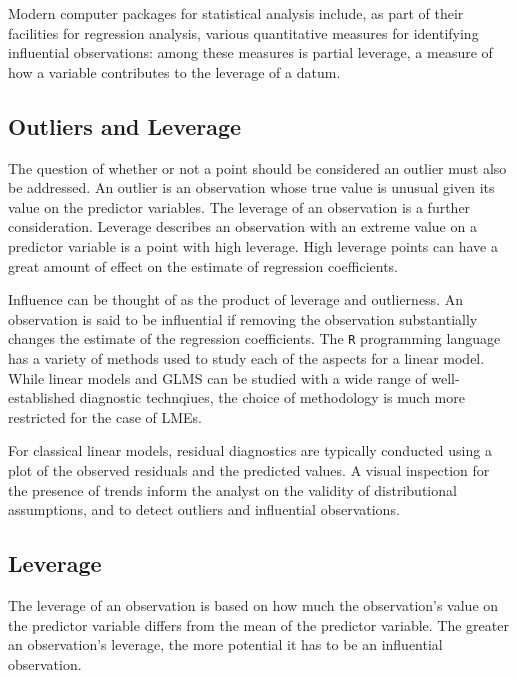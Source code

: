 \documentclass[12pt, a4paper]{article}
\begin{document}
Modern computer packages for statistical analysis include, as part of their facilities for regression analysis, various quantitative measures for identifying influential observations: among these measures is partial leverage, a measure of how a variable contributes to the leverage of a datum.




\subsection{Outliers and Leverage}


The question of whether or not a point should be considered an outlier must also be addressed. An outlier is an observation whose true value is unusual given its value on the predictor variables. The leverage of an observation is a further consideration. Leverage describes an observation with an extreme value on a predictor variable is a point with high leverage. High leverage points can have a great amount of effect on the estimate of regression coefficients.

Influence can be thought of as the product of leverage and outlierness. An observation is said to be influential if removing the observation substantially changes the estimate of the regression coefficients. The \texttt{R} programming language has a variety of methods used to study each of the aspects for a linear model. While linear models and GLMS can be studied with a wide range of well-established diagnostic technqiues, the choice of methodology is much more restricted for the case of LMEs.

For classical linear models, residual diagnostics are typically conducted using a plot of the observed residuals and the predicted values. A visual inspection for the presence of trends inform the analyst on the validity of distributional assumptions, and to detect outliers and influential observations.


\subsection{Leverage}
The leverage of an observation is based on how much the observation's value on the predictor variable differs from the mean of the predictor variable. The greater an observation's leverage, the more potential it has to be an influential observation. 
			
\end{document}
